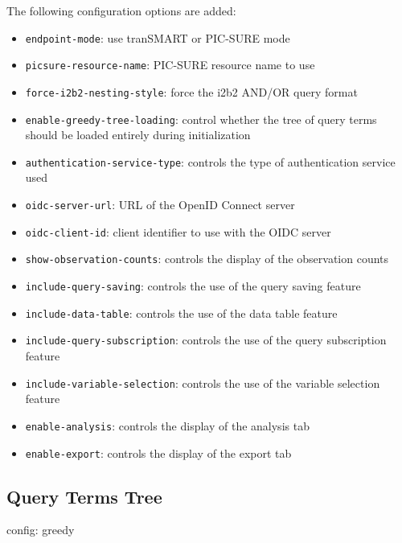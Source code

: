 The following configuration options are added:
\begin{itemize}
    \setlength\itemsep{0em}

    \item \verb|endpoint-mode|: use tranSMART or PIC-SURE mode
    \item \verb|picsure-resource-name|: PIC-SURE resource name to use
    \item \verb|force-i2b2-nesting-style|: force the i2b2 AND/OR query format
    \item \verb|enable-greedy-tree-loading|: control whether the tree of query terms should be loaded entirely during initialization \\

    \item \verb|authentication-service-type|: controls the type of authentication service used
    \item \verb|oidc-server-url|: URL of the OpenID Connect server
    \item \verb|oidc-client-id|: client identifier to use with the OIDC server \\
    
    \item \verb|show-observation-counts|: controls the display of the observation counts
    \item \verb|include-query-saving|: controls the use of the query saving feature
    \item \verb|include-data-table|: controls the use of the data table feature
    \item \verb|include-query-subscription|: controls the use of the query subscription feature
    \item \verb|include-variable-selection|: controls the use of the variable selection feature
    \item \verb|enable-analysis|: controls the display of the analysis tab
    \item \verb|enable-export|: controls the display of the export tab

\end{itemize}




\subsection{Query Terms Tree}
config: greedy 

